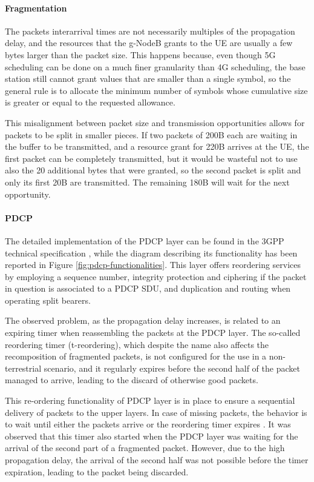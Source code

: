 \paragraph{Fragmentation}
The packets interarrival times are not necessarily multiples of the propagation delay, and the resources that the g-NodeB grants to the \ac{UE} are usually a few bytes larger than the packet size. This happens because, even though 5G scheduling can be done on a much finer granularity than 4G scheduling, the base station still cannot grant values that are smaller than a single symbol, so the general rule is to allocate the minimum number of symbols whose cumulative size is greater or equal to the requested allowance.

This misalignment between packet size and transmission opportunities allows for packets to be split in smaller pieces. If two packets of 200B each are waiting in the buffer to be transmitted, and a resource grant for 220B arrives at the \ac{UE}, the first packet can be completely transmitted, but it would be wasteful not to use also the 20 additional bytes that were granted, so the second packet is split and only its first 20B are transmitted. The remaining 180B will wait for the next opportunity.

\paragraph{PDCP}
The detailed implementation of the \ac{PDCP} layer can be found in the \ac{3GPP} technical specification \cite{pdcp-spec-3gpp}, while the diagram describing its functionality has been reported in Figure \ref{fig:pdcp-functionalities}. This layer offers reordering services by employing a sequence number, integrity protection and ciphering if the packet in question is associated to a \ac{PDCP} \ac{SDU}, and duplication and routing when operating split bearers.

The observed problem, as the propagation delay increases, is related to an expiring timer when reassembling the packets at the \ac{PDCP} layer. The so-called reordering timer (t-reordering), which despite the name also affects the recomposition of fragmented packets, is not configured for the use in a non-terrestrial scenario, and it regularly expires before the second half of the packet managed to arrive, leading to the discard of otherwise good packets.

This re-ordering functionality of \ac{PDCP} layer is in place to ensure a sequential delivery of packets to the upper layers. In case of missing packets, the behavior is to wait until either the packets arrive or the reordering timer expires \cite{efficient-reassembly-pdcp}. It was observed that this timer also started when the \ac{PDCP} layer was waiting for the arrival of the second part of a fragmented packet. However, due to the high propagation delay, the arrival of the second half was not possible before the timer expiration, leading to the packet being discarded.

